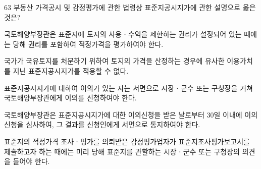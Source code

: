\begin{question}{63}
부동산 가격공시 및 감정평가에 관한 법령상 표준지공시지가에 관한 설명으로 옳은 것은?
\begin{choices}
  \item 국토해양부장관은 표준지에 토지의 사용ㆍ수익을 제한하는 권리가 설정되어 있는 때에는 당해 권리를 포함하여 적정가격을 평가하여야 한다.
  \item 국가가 국유토지를 처분하기 위하여 토지의 가격을 산정하는 경우에 유사한 이용가치를 지닌 표준지공시지가를 적용할 수 없다.
  \item 표준지공시지가에 대하여 이의가 있는 자는 서면으로 시장ㆍ군수 또는 구청장을 거쳐 국토해양부장관에게 이의를 신청하여야 한다.
  \item 국토해양부장관은 표준지공시지가에 대한 이의신청을 받은 날로부터 30일 이내에 이의신청을 심사하여, 그 결과를 신청인에게 서면으로 통지하여야 한다.
  \item 표준지의 적정가격 조사ㆍ평가를 의뢰받은 감정평가업자가 표준지조사평가보고서를 제출하고자 하는 때에는 미리 당해 표준지를 관할하는 시장ㆍ군수 또는 구청장의 의견을 들어야 한다.
\end{choices}
\end{question}
